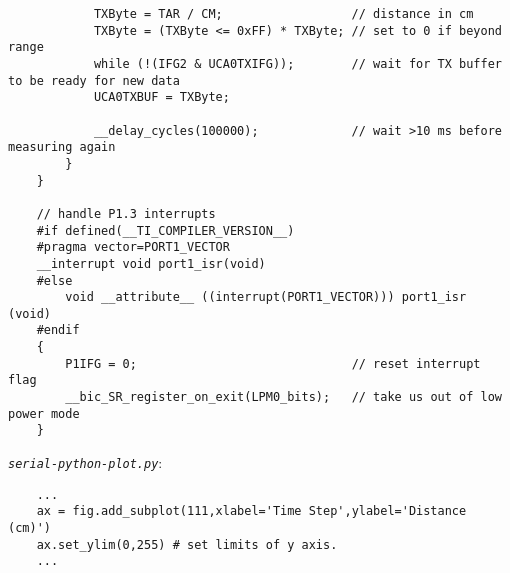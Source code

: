 \documentclass[letterpaper]{article}
\begin{document}
\begin{verbatim}
            TXByte = TAR / CM;                  // distance in cm
            TXByte = (TXByte <= 0xFF) * TXByte; // set to 0 if beyond range
            while (!(IFG2 & UCA0TXIFG));        // wait for TX buffer to be ready for new data
            UCA0TXBUF = TXByte;           
    
            __delay_cycles(100000);             // wait >10 ms before measuring again
        }
    }
    
    // handle P1.3 interrupts
    #if defined(__TI_COMPILER_VERSION__)
    #pragma vector=PORT1_VECTOR
    __interrupt void port1_isr(void)
    #else
        void __attribute__ ((interrupt(PORT1_VECTOR))) port1_isr (void)
    #endif
    {
        P1IFG = 0;                              // reset interrupt flag
        __bic_SR_register_on_exit(LPM0_bits);   // take us out of low power mode
    }
	\end{verbatim}
	
	\noindent \textit{\texttt{serial-python-plot.py}}:
	\begin{verbatim}
	...
	ax = fig.add_subplot(111,xlabel='Time Step',ylabel='Distance (cm)')
	ax.set_ylim(0,255) # set limits of y axis.
	...
	\end{verbatim}
\end{document}
